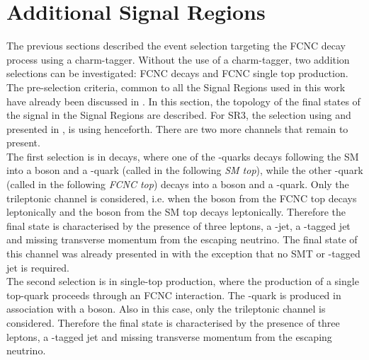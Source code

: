 \section{Additional Signal Regions}
\label{sec:selection_all}
The previous sections described the event selection targeting the FCNC \ttbar decay process using a charm-tagger. Without the use of a charm-tagger, two addition selections can be investigated: FCNC \ttbar decays and FCNC single top production.\\
The pre-selection criteria, common to all the Signal Regions used in this work have already been discussed in .
In this section, the topology of the final states of the signal in the Signal Regions are described. 
For SR3\tZc, the selection using \DLrc and presented in , is using henceforth.
There are two more channels that remain to present.
\vspace{\baselineskip}
\\The first selection is \FCNCtZc in \ttbar decays, where one of the \Pqt-quarks decays following the SM into a \PW boson and a
\Pqb-quark (called in the following \textit{SM top}), while the other
\Pqt-quark (called in the following \textit{FCNC top}) decays into a \PZ
boson and a \Pqc-quark. Only the
trileptonic channel is considered, i.e. when the \PZ boson from the
FCNC top decays leptonically and the \PW boson from the SM top
decays leptonically. Therefore the final state is characterised by
the presence of three leptons, a \Pqc-jet, a \Pqb-tagged jet and missing
transverse momentum from the escaping neutrino.  
The final state of this channel was already presented in   with the exception that no SMT or \Pqc-tagged jet is required.
\vspace{\baselineskip}
\\The second selection is \FCNCtZc in single-top production, where the
production of a single top-quark proceeds through an FCNC
interaction. The \Pqt-quark is produced in association with a \PZ
boson. Also in this case, only the trileptonic channel is
considered. Therefore the final state is characterised by
the presence of three leptons, a \Pqb-tagged jet and missing
transverse momentum from the escaping neutrino. 


